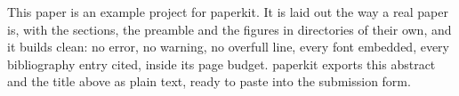 This paper is an example project for paperkit. It is laid out the way a real
paper is, with the sections, the preamble and the figures in directories of
their own, and it builds clean: no error, no warning, no overfull line, every
font embedded, every bibliography entry cited, inside its page budget.
paperkit exports this abstract and the title above as plain text, ready to
paste into the submission form.
